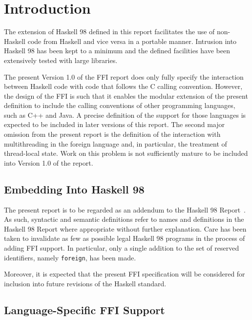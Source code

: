\documentclass[a4paper,twoside]{article}
\newcommand{\code}[1]{\texttt{#1}}      %
\newcommand{\clearemptydoublepage}{%
  \newpage{\pagestyle{empty}\cleardoublepage}}
\begin{document}
\clearemptydoublepage
{}
\section{Introduction}

The extension of Haskell 98 defined in this report facilitates the use of
non-Haskell code from Haskell and vice versa in a portable manner.  Intrusion
into Haskell 98 has been kept to a minimum and the defined facilities have
been extensively tested with large libraries.

The present Version 1.0 of the FFI report does only fully specify the
interaction between Haskell code with code that follows the C calling
convention.  However, the design of the FFI is such that it enables the
modular extension of the present definition to include the calling conventions
of other programming languages, such as C++ and Java.  A precise definition of
the support for those languages is expected to be included in later versions
of this report.  The second major omission from the present report is the
definition of the interaction with multithreading in the foreign language and,
in particular, the treatment of thread-local state.  Work on this problem is
not sufficiently mature to be included into Version 1.0 of the report.

\subsection{Embedding Into Haskell 98}

The present report is to be regarded as an addendum to the Haskell 98
Report~\cite{haskell98}.  As such, syntactic and semantic definitions refer to
names and definitions in the Haskell 98 Report where appropriate without
further explanation.  Care has been taken to invalidate as few as possible
legal Haskell 98 programs in the process of adding FFI support.  In
particular, only a single addition to the set of reserved identifiers, namely
\code{foreign}, has been made.

Moreover, it is expected that the present FFI specification will be considered
for inclusion into future revisions of the Haskell standard.

\subsection{Language-Specific FFI Support}
\end{document}
